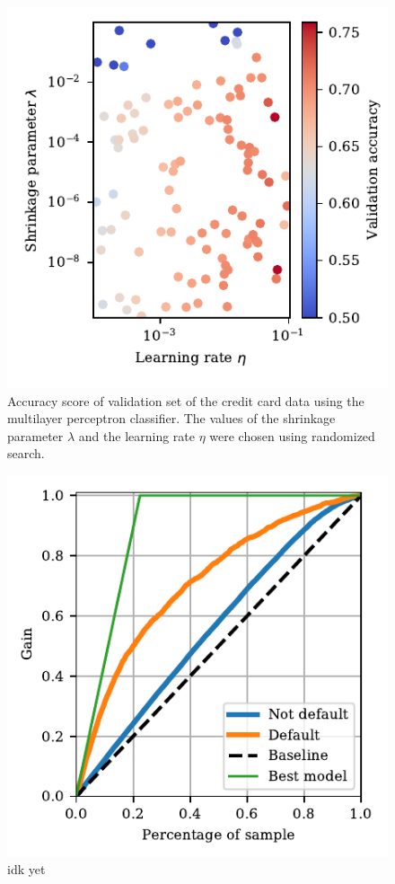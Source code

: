 \documentclass[a4paper, 11pt, twocolumn]{article}
\begin{document}
\begin{figure}[H]
	\includegraphics[scale=1]{figures/nn_learning_rate_lambda_accuracy_credit.pdf}
	\caption{Accuracy score of validation set of the credit card data using the multilayer perceptron classifier. The values of the shrinkage parameter $\lambda$ and the learning rate $\eta$ were chosen using randomized search.}
\end{figure}


\begin{figure}[H]
	\includegraphics[scale=1]{figures/cumulative_gain_NN.pdf}
	\caption{idk yet}
\end{figure}
\end{document}
